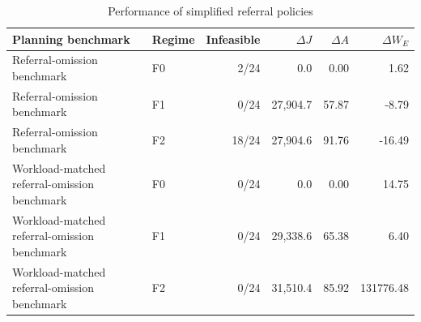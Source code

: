 \begin{table}[ht]
\centering\footnotesize
\caption{Performance of simplified referral policies}\label{tab:transferdetails}
\begin{tabular}{@{}llrrrr@{}}\toprule
Planning benchmark & Regime & Infeasible & $\Delta J$ & $\Delta A$ & $\Delta W_E$\\\midrule
Referral-omission benchmark & F0 & 2/24 & 0.0 & 0.00 & 1.62\\
Referral-omission benchmark & F1 & 0/24 & 27,904.7 & 57.87 & -8.79\\
Referral-omission benchmark & F2 & 18/24 & 27,904.6 & 91.76 & -16.49\\
Workload-matched referral-omission benchmark & F0 & 0/24 & 0.0 & 0.00 & 14.75\\
Workload-matched referral-omission benchmark & F1 & 0/24 & 29,338.6 & 65.38 & 6.40\\
Workload-matched referral-omission benchmark & F2 & 0/24 & 31,510.4 & 85.92 & 131776.48\\
\bottomrule\end{tabular}
\end{table}
